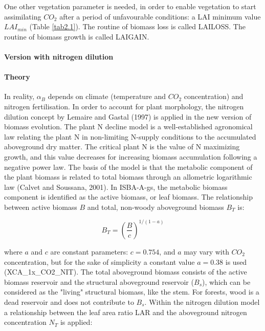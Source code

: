 {One other vegetation parameter is needed, in order to enable vegetation to start assimilating $CO_{2}$ after
a period of unfavourable conditions: a LAI minimum value $LAI_{min}$ (Table \ref{tab2.1}).
The routine of biomass loss is called LAILOSS. The routine of biomass growth is called LAIGAIN.

\paragraph{Version with nitrogen dilution}

\paragraph{Theory}

In reality, $\alpha_{B}$ depends on climate (temperature and $CO_{2}$ concentration) and nitrogen fertilisation. In
order to account for plant morphology, the nitrogen dilution concept by Lemaire and Gastal (1997)\nocite{Lemaire1997} is
applied in the new version of biomass evolution. The plant N decline model is a well-established
agronomical law relating the plant N in non-limiting N-supply conditions to the accumulated aboveground
dry matter. The critical plant N is the value of N maximizing growth, and this value decreases
for increasing biomass accumulation following a negative power law. The basis of the model is that the
metabolic component of the plant biomass is related to total biomass through an allometric logarithmic
law (Calvet and Soussana, 2001). In ISBA-A-gs, the metabolic biomass component is identified as the
active biomass, or leaf biomass. The relationship between active biomass $B$ and total, non-woody
aboveground biomass $B_{T}$ is:

\begin{equation}\label{eq47}
B_{T} = \left ( \frac{B}{c} \right )^{1/(1-a)}
\end{equation}


where $a$ and $c$ are constant parameters: $c=0.754$, and $a$ may vary with $CO_{2}$ concentration, but for the
sake of simplicity a constant value $a=0.38$ is used (XCA\_1x\_CO2\_NIT). The total aboveground
biomass consists of the active biomass reservoir and the structural aboveground reservoir ($B_{s}$), which
can be considered as the "living" structural biomass, like the stem. For forests, wood is a dead
reservoir and does not contribute to $B_{s}$. Within the nitrogen dilution model a relationship between the
leaf area ratio LAR and the aboveground nitrogen concentration $N_{T}$ is applied:

}
